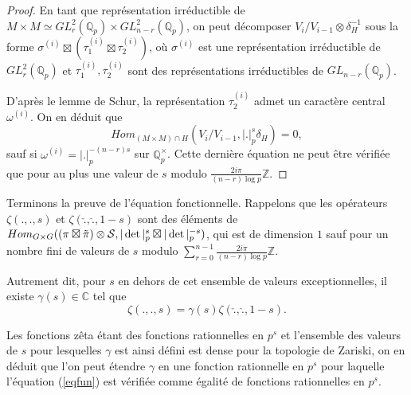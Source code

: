 \documentclass{amsart}
\DeclareMathOperator{\Hom}{\mathnormal{Hom}}
\begin{document}
\begin{proof}
En tant que représentation irréductible de $M \times M \simeq GL_r^2(\mathbb{Q}_p) \times GL_{n-r}^2(\mathbb{Q}_p)$, on peut décomposer $V_i/V_{i-1} \otimes \delta_H^{-1}$ sous la forme
$\sigma^{(i)} \boxtimes (\tau_1^{(i)} \boxtimes \tau_2^{(i)})$, où $\sigma^{(i)}$ est une représentation irréductible de $GL_r^2(\mathbb{Q}_p)$ et $\tau_1^{(i)}, \tau_2^{(i)}$ sont des représentations irréductibles de $GL_{n-r}(\mathbb{Q}_p)$.

D'après le lemme de Schur, la représentation $\tau_2^{(i)}$ admet un caractère central $\omega^{(i)}$. On en déduit que
\begin{equation}
Hom_{(M \times M) \cap H} (V_i/V_{i-1}, |.|_p^s\delta_H) = 0,
\end{equation}
sauf si $\omega^{(i)} = |.|_p^{-(n-r)s}$ sur $\mathbb{Q}_p^\times$. Cette dernière équation ne peut être vérifiée que pour au plus une valeur de $s$ modulo $\frac{2i\pi}{(n-r)\log p}\mathbb{Z}$.
\end{proof}

Terminons la preuve de l'équation fonctionnelle. Rappelons que les opérateurs $\zeta(., ., s)$ et $\zeta(\check{.}, \hat{.}, 1-s)$ sont des éléments de $\Hom_{G \times G} ( (\pi \boxtimes \tilde{\pi}) \otimes \mathcal{S}, |\det|_p^s \boxtimes |\det|_p^{-s})$, qui est de dimension $1$ sauf pour un nombre fini de valeurs de $s$ modulo $\sum_{r=0}^{n-1}\frac{2i\pi}{(n-r)\log p}\mathbb{Z}$.

Autrement dit, pour $s$ en dehors de cet ensemble de valeurs exceptionnelles, il existe $\gamma(s) \in \mathbb{C}$ tel que
\begin{equation}
\label{eqfun}
\zeta(., ., s) = \gamma(s) \zeta(\check{.}, \hat{.}, 1-s).
\end{equation}

Les fonctions zêta étant des fonctions rationnelles en $p^s$ et l'ensemble des valeurs de $s$ pour lesquelles $\gamma$ est ainsi défini est dense pour la topologie de Zariski, on en déduit que l'on peut étendre $\gamma$ en une fonction rationnelle en $p^s$ pour laquelle l'équation (\ref{eqfun}) est vérifiée comme égalité de fonctions rationnelles en $p^s$. 
\end{document}
